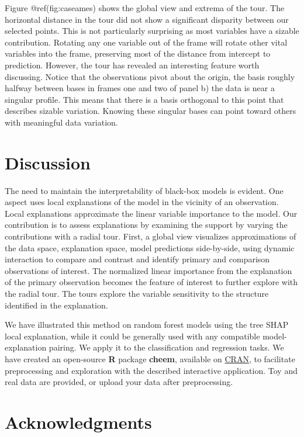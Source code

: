 \documentclass[
]{article}
\begin{document}
Figure @ref(fig:caseames) shows the global view and extrema of the tour.
The horizontal distance in the tour did not show a significant disparity
between our selected points. This is not particularly surprising as most
variables have a sizable contribution. Rotating any one variable out of
the frame will rotate other vital variables into the frame, preserving
most of the distance from intercept to prediction. However, the tour has
revealed an interesting feature worth discussing. Notice that the
observations pivot about the origin, the basis roughly halfway between
bases in frames one and two of panel b) the data is near a singular
profile. This means that there is a basis orthogonal to this point that
describes sizable variation. Knowing these singular bases can point
toward others with meaningful data variation.

\hypertarget{sec:cheemdiscussion}{%
\section{Discussion}\label{sec:cheemdiscussion}}

The need to maintain the interpretability of black-box models is
evident. One aspect uses local explanations of the model in the vicinity
of an observation. Local explanations approximate the linear variable
importance to the model. Our contribution is to assess explanations by
examining the support by varying the contributions with a radial tour.
First, a global view visualizes approximations of the data space,
explanation space, model predictions side-by-side, using dynamic
interaction to compare and contrast and identify primary and comparison
observations of interest. The normalized linear importance from the
explanation of the primary observation becomes the feature of interest
to further explore with the radial tour. The tours explore the variable
sensitivity to the structure identified in the explanation.

We have illustrated this method on random forest models using the tree
SHAP local explanation, while it could be generally used with any
compatible model-explanation pairing. We apply it to the classification
and regression tasks. We have created an open-source \textbf{R} package
\textbf{cheem}, available on
\href{https://CRAN.R-project.org/package=cheem}{CRAN}, to facilitate
preprocessing and exploration with the described interactive
application. Toy and real data are provided, or upload your data after
preprocessing.

\hypertarget{acknowledgments}{%
\section{Acknowledgments}\label{acknowledgments}}
\end{document}
